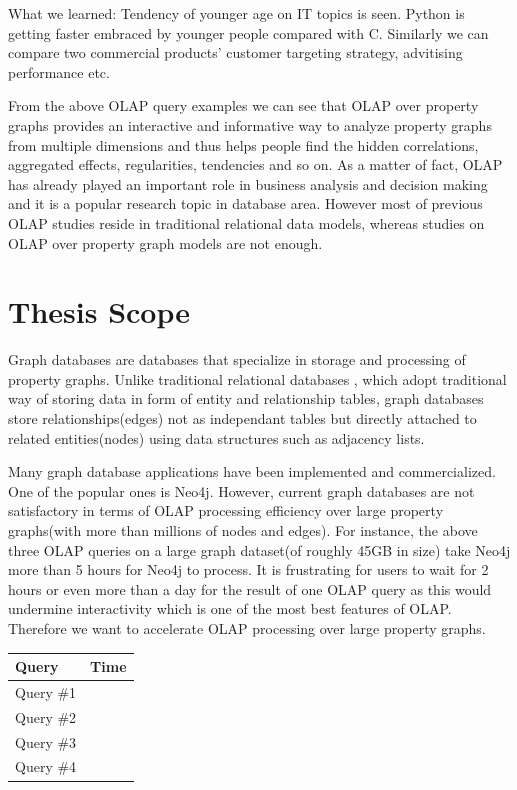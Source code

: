 What we learned:	Tendency of younger age on IT topics is seen. 
Python is getting faster embraced by younger people compared with C. Similarly we can compare two commercial products’ customer targeting strategy, advitising performance etc. 
 
From the above OLAP query examples we can see that OLAP over property graphs provides an interactive and informative way to analyze property graphs from multiple dimensions and thus helps people find the hidden correlations, aggregated effects, regularities, tendencies and so on. As a matter of fact, OLAP has already played an important role in business analysis and decision making and it is a popular research topic in database area. However most of previous OLAP studies reside in traditional relational data models, whereas studies on OLAP over property graph models are not enough. 


\section{Thesis Scope}
Graph databases are databases that specialize in storage and processing of property graphs. Unlike traditional relational databases , which adopt traditional way of storing data in form of entity and relationship tables, graph databases store relationships(edges) not as independant tables but directly attached to related entities(nodes)  using data structures such as adjacency lists. 

Many graph database applications have been implemented and commercialized. One of the popular ones is Neo4j. However, current graph databases are not satisfactory in terms of OLAP processing efficiency over large property graphs(with more than millions of nodes and edges). For instance, the above three OLAP queries on a large graph dataset(of roughly 45GB in size) take Neo4j more than 5 hours for Neo4j to process. It is frustrating for users to wait for 2 hours or even more than a day for the result of one OLAP query as this would undermine interactivity which is one of the most best features of OLAP. Therefore we want to accelerate OLAP processing over large property graphs.

\begin{center}
	\begin{tabular}{ | l | l | } 
		\hline 
		Query 	& Time	\\ \hline 
		Query \#1	& \\ \hline
		Query \#2	& \\ \hline
		Query \#3	& \\ \hline
		Query \#4	& \\ \hline
	\end{tabular}
	\end {center}
 

